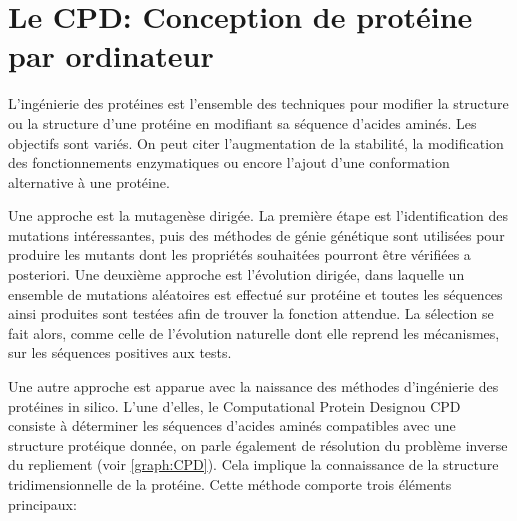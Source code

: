 \chapter{Le \og CPD\fg: Conception de protéine par ordinateur}
\label{chap:CPD}
L'ingénierie des protéines est l'ensemble des techniques pour modifier la structure  ou la structure d'une protéine en modifiant sa séquence d'acides aminés. Les objectifs sont variés. On peut citer l'augmentation de la stabilité, la modification des fonctionnements enzymatiques ou encore l'ajout d'une conformation alternative à une protéine.

Une approche est la mutagenèse dirigée. La première étape est l'identification des mutations intéressantes, puis des méthodes de génie génétique sont utilisées pour produire les mutants dont les propriétés souhaitées pourront être vérifiées a posteriori. Une deuxième approche est l'évolution dirigée, dans laquelle un ensemble de mutations aléatoires est effectué sur protéine et toutes les séquences ainsi produites sont testées afin de trouver la fonction attendue. La sélection se fait alors, comme celle de l'évolution naturelle dont elle reprend les mécanismes, sur les séquences positives aux tests.

Une autre approche est apparue avec la naissance des méthodes d'ingénierie des protéines \og in silico\fg. L'une d'elles, le \og Computational Protein Design\fg ou CPD consiste à déterminer les séquences d'acides aminés compatibles avec une structure protéique donnée, on parle également de résolution du problème inverse du repliement (voir \ref{graph:CPD}). Cela implique la connaissance de la structure tridimensionnelle de la protéine. Cette méthode comporte trois éléments principaux:

